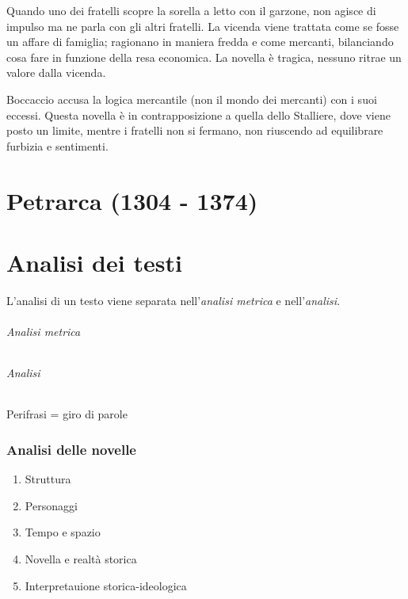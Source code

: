 \documentclass[a4paper]{article}
\begin{document}
Quando uno dei fratelli scopre la sorella a letto con il garzone, non agisce di impulso ma ne parla con gli altri fratelli.
La vicenda viene trattata come se fosse un affare di famiglia; ragionano in maniera fredda e come mercanti, bilanciando cosa fare in funzione della resa economica.
La novella è tragica, nessuno ritrae un valore dalla vicenda.

Boccaccio accusa la logica mercantile (non il mondo dei mercanti) con i suoi eccessi.
Questa novella è in contrapposizione a quella dello Stalliere, dove viene posto un limite, mentre i fratelli non si fermano, non riuscendo ad equilibrare furbizia e sentimenti.

\pagebreak

\part{Petrarca (1304 - 1374)}

\pagebreak

\part{Analisi dei testi}


L'analisi di un testo viene separata nell'\textit{analisi metrica} e nell'\textit{analisi}.

\paragraph{Analisi metrica}

\phantom{ }\vspace{0.1cm}

\paragraph{Analisi}

Perifrasi = giro di parole

\section{Analisi delle novelle}

\begin{enumerate}
    \item Struttura
    \item Personaggi
    \item Tempo e spazio
    \item Novella e realtà storica
    \item Interpretauione storica-ideologica
\end{enumerate}
\end{document}
